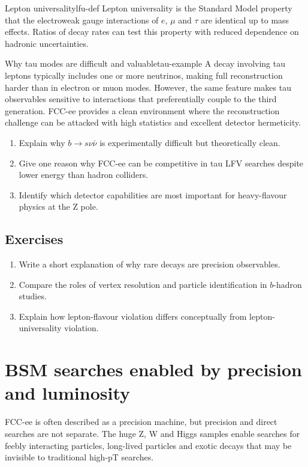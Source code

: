 \documentclass[11pt,a4paper]{article}
\numberwithin{equation}{section}
\begin{document}
\begin{definition}{Lepton universality}{lfu-def}
Lepton universality is the Standard Model property that the electroweak gauge interactions of \(e\), \(\mu\) and \(\tau\) are identical up to mass effects. Ratios of decay rates can test this property with reduced dependence on hadronic uncertainties.
\end{definition}

\begin{examplebox}{Why tau modes are difficult and valuable}{tau-example}
A decay involving tau leptons typically includes one or more neutrinos, making full reconstruction harder than in electron or muon modes. However, the same feature makes tau observables sensitive to interactions that preferentially couple to the third generation. FCC-ee provides a clean environment where the reconstruction challenge can be attacked with high statistics and excellent detector hermeticity.
\end{examplebox}

\begin{guidedchecksbox}
\begin{enumerate}[leftmargin=1.6em]
\item Explain why \(b\to s\nu\bar\nu\) is experimentally difficult but theoretically clean.
\item Give one reason why FCC-ee can be competitive in tau LFV searches despite lower energy than hadron colliders.
\item Identify which detector capabilities are most important for heavy-flavour physics at the Z pole.
\end{enumerate}
\end{guidedchecksbox}

\subsection{Exercises}
\begin{enumerate}[leftmargin=1.6em]
\item Write a short explanation of why rare decays are precision observables.
\item Compare the roles of vertex resolution and particle identification in \(b\)-hadron studies.
\item Explain how lepton-flavour violation differs conceptually from lepton-universality violation.
\end{enumerate}


\newpage
\section{BSM searches enabled by precision and luminosity}
\begin{guidelinebox}
FCC-ee is often described as a precision machine, but precision and direct searches are not separate. The huge Z, W and Higgs samples enable searches for feebly interacting particles, long-lived particles and exotic decays that may be invisible to traditional high-pT searches.
\end{guidelinebox}
\end{document}
